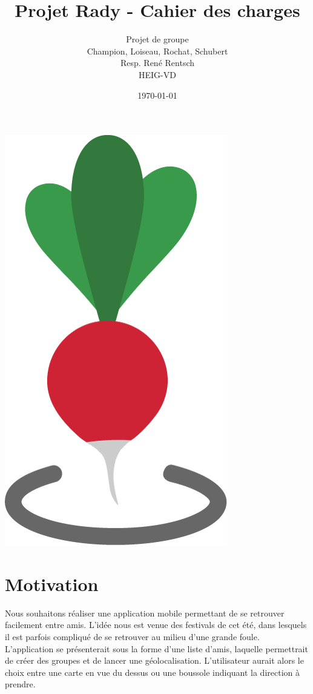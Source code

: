 \documentclass[french]{article}
\begin{document}
	
	\title{Projet Rady - Cahier des charges}
	\author{Projet de groupe\\
		Champion, Loiseau, Rochat, Schubert\\
		Resp. René Rentsch\\
		HEIG-VD}
	\date{\today}
	\maketitle
	\vspace{5cm}
	\centering
	\includegraphics[scale=0.3]{../logo/icone}
	\thispagestyle{empty}
	\newpage
	
	\tableofcontents
	\newpage
	
	\justify
	
	\section{Motivation}
		 Nous souhaitons réaliser une application mobile permettant de se retrouver facilement entre amis. L’idée nous est venue des festivals de cet été, dans lesquels il est parfois compliqué de se retrouver au milieu d’une grande foule. L’application se présenterait sous la forme d’une liste d’amis, laquelle permettrait de créer des groupes et de lancer une géolocalisation. L’utilisateur aurait alors le choix entre une carte en vue du dessus ou une boussole indiquant la direction à
		 prendre.
	
\end{document}
